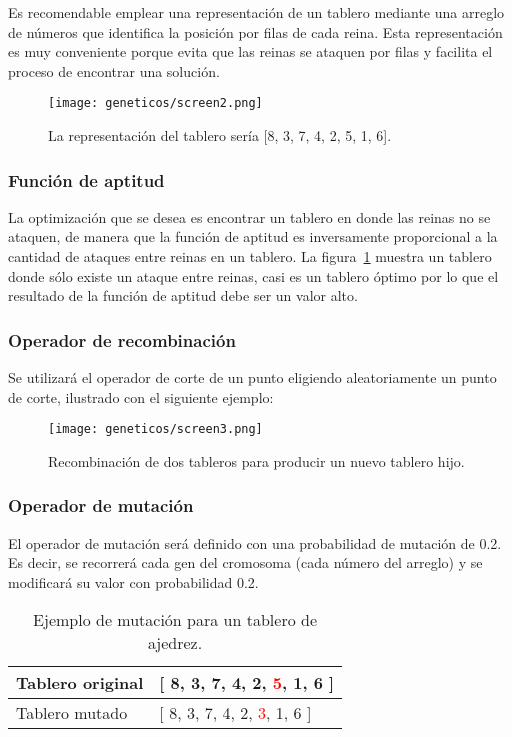 Es recomendable emplear una representación de un tablero mediante una arreglo de números que identifica la posición por filas de cada reina.
Esta representación es muy conveniente porque evita que las reinas se ataquen por filas y facilita el proceso de encontrar una solución.

\begin{figure}[H]
  \centering
  \texttt{[image: geneticos/screen2.png]}
  \caption{La representación del tablero sería [8, 3, 7, 4, 2, 5, 1, 6].}
  \label{fig:P8screen2}
\end{figure}


\subsubsection{Funci\'on de aptitud}\par

La optimización que se desea es encontrar un tablero en donde las reinas no se ataquen, de manera que la función de aptitud es inversamente proporcional a la cantidad de ataques entre reinas en un tablero.
La figura~\ref{fig:P8screen2} muestra un tablero donde sólo existe un ataque entre reinas, casi es un tablero óptimo por lo que el resultado de la función de aptitud debe ser un valor alto.

\subsubsection{Operador de recombinaci\'on}

Se utilizará el operador de corte de un punto eligiendo aleatoriamente un punto de corte, ilustrado con el siguiente ejemplo:

\begin{figure}[H]
  \centering
  \texttt{[image: geneticos/screen3.png]}
  \caption{Recombinación de dos tableros para producir un nuevo tablero hijo.}
\end{figure}


\subsubsection{Operador de mutaci\'on}

El operador de mutación será definido con una probabilidad de mutación de 0.2. Es decir, se recorrerá cada gen del cromosoma (cada número del arreglo) y se modificará su valor con probabilidad 0.2.

\begin{table}[H]
  \centering
  \begin{tabular}{|l|l|}
  \hline
  Tablero original & {[} 8, 3, 7, 4, 2, \textcolor{red}{5}, 1, 6 {]}  \\ \hline
  Tablero mutado   & {[} 8, 3, 7, 4, 2, \textcolor{red}{3}, 1, 6 {]}  \\ \hline
  \end{tabular}
  \caption{Ejemplo de mutación para un tablero de ajedrez.}
\end{table}

